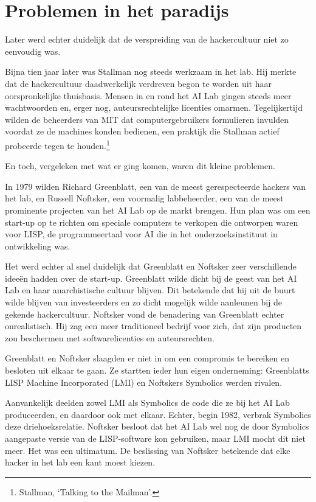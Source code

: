 \documentclass[smalldemyvopaper,11pt,twoside,onecolumn,openright,extrafontsizes,hidelinks]{memoir}
\begin{document}
\section{Problemen in het paradijs}\label{problemen-in-het-paradijs}

Later werd echter duidelijk dat de verspreiding van de hackercultuur
niet zo eenvoudig was.

Bijna tien jaar later was Stallman nog steeds werkzaam in het lab. Hij
merkte dat de hackercultuur daadwerkelijk verdreven begon te worden uit
haar oorspronkelijke thuisbasis. Mensen in en rond het AI Lab gingen
steeds meer wachtwoorden en, erger nog, auteursrechtelijke licenties
omarmen. Tegelijkertijd wilden de beheerders van MIT dat
computergebruikers formulieren invulden voordat ze de machines konden
bedienen, een praktijk die Stallman actief probeerde tegen te
houden.\footnote{\hspace{0pt}Stallman, `Talking to the Mailman'.}

En toch, vergeleken met wat er ging komen, waren dit kleine problemen.

In 1979 wilden Richard Greenblatt, een van de meest gerespecteerde
hackers van het lab, en Russell Noftsker, een voormalig labbeheerder,
een van de meest prominente projecten van het AI Lab op de markt
brengen. Hun plan was om een start-up op te richten om speciale
computers te verkopen die ontworpen waren voor LISP, de programmeertaal
voor AI die in het onderzoeksinstituut in ontwikkeling was.

Het werd echter al snel duidelijk dat Greenblatt en Noftsker zeer
verschillende ideeën hadden over de start-up. Greenblatt wilde dicht bij
de geest van het AI Lab en haar anarchistische cultuur blijven. Dit
betekende dat hij uit de buurt wilde blijven van investeerders en zo
dicht mogelijk wilde aanleunen bij de gekende hackercultuur. Noftsker
vond de benadering van Greenblatt echter onrealistisch. Hij zag een meer
traditioneel bedrijf voor zich, dat zijn producten zou beschermen met
softwarelicenties en auteursrechten.

Greenblatt en Noftsker slaagden er niet in om een compromis te bereiken
en besloten uit elkaar te gaan. Ze startten ieder hun eigen onderneming:
Greenblatts LISP Machine Incorporated (LMI) en Noftskers Symbolics
werden rivalen.

Aanvankelijk deelden zowel LMI als Symbolics de code die ze bij het AI
Lab produceerden, en daardoor ook met elkaar. Echter, begin 1982,
verbrak Symbolics deze driehoeksrelatie. Noftsker besloot dat het AI Lab
wel nog de door Symbolics aangepaste versie van de LISP-software kon
gebruiken, maar LMI mocht dit niet meer. Het was een ultimatum. De
beslissing van Noftsker betekende dat elke hacker in het lab een kant
moest kiezen.
\end{document}
